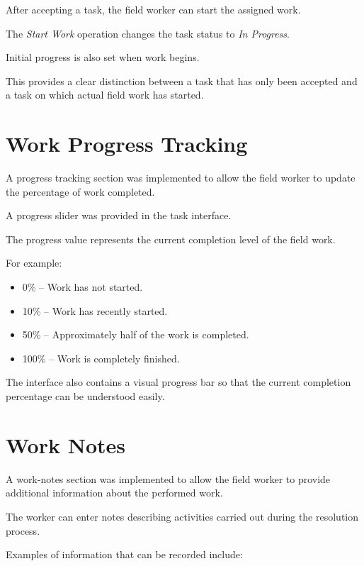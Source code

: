 \documentclass[12pt,a4paper]{article}
\begin{document}
After accepting a task, the field worker can start the assigned work.

The \textit{Start Work} operation changes the task status to
\textit{In Progress}.

Initial progress is also set when work begins.

This provides a clear distinction between a task that has only been accepted
and a task on which actual field work has started.

\section{Work Progress Tracking}

A progress tracking section was implemented to allow the field worker to
update the percentage of work completed.

A progress slider was provided in the task interface.

The progress value represents the current completion level of the field
work.

For example:

\begin{itemize}
    \item 0\% -- Work has not started.
    \item 10\% -- Work has recently started.
    \item 50\% -- Approximately half of the work is completed.
    \item 100\% -- Work is completely finished.
\end{itemize}

The interface also contains a visual progress bar so that the current
completion percentage can be understood easily.

\section{Work Notes}

A work-notes section was implemented to allow the field worker to provide
additional information about the performed work.

The worker can enter notes describing activities carried out during the
resolution process.

Examples of information that can be recorded include:
\end{document}
